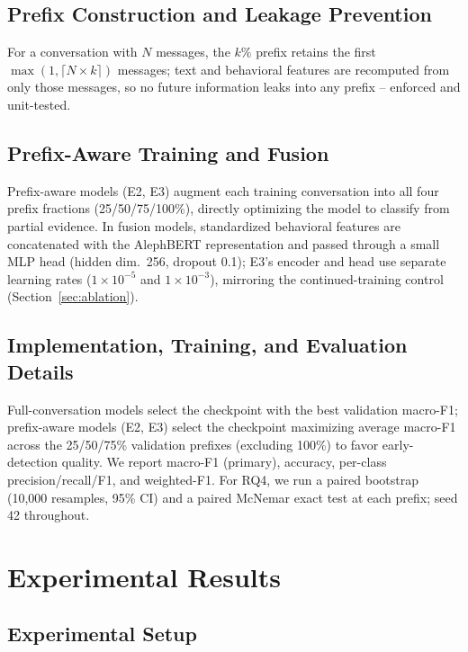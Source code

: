 \documentclass{article}
\begin{document}
\subsection{Prefix Construction and Leakage Prevention}
\label{sec:prefix}

For a conversation with $N$ messages, the $k\%$ prefix retains the first $\max(1, \lceil N \times k \rceil)$ messages; text and behavioral features are recomputed from only those messages, so no future information leaks into any prefix -- enforced and unit-tested.

\subsection{Prefix-Aware Training and Fusion}
\label{sec:training}

Prefix-aware models (E2, E3) augment each training conversation into all four prefix fractions (25/50/75/100\%), directly optimizing the model to classify from partial evidence. In fusion models, standardized behavioral features are concatenated with the AlephBERT representation and passed through a small MLP head (hidden dim.\ 256, dropout 0.1); E3's encoder and head use separate learning rates ($1\times10^{-5}$ and $1\times10^{-3}$), mirroring the continued-training control (Section~\ref{sec:ablation}).

\subsection{Implementation, Training, and Evaluation Details}
\label{sec:implementation}

Full-conversation models select the checkpoint with the best validation macro-F1; prefix-aware models (E2, E3) select the checkpoint maximizing average macro-F1 across the 25/50/75\% validation prefixes (excluding 100\%) to favor early-detection quality. We report macro-F1 (primary), accuracy, per-class precision/recall/F1, and weighted-F1. For RQ4, we run a paired bootstrap (10,000 resamples, 95\% CI) and a paired McNemar exact test at each prefix; seed 42 throughout.

\section{Experimental Results}
\label{sec:results}

\subsection{Experimental Setup}
\label{sec:setup}
\end{document}
